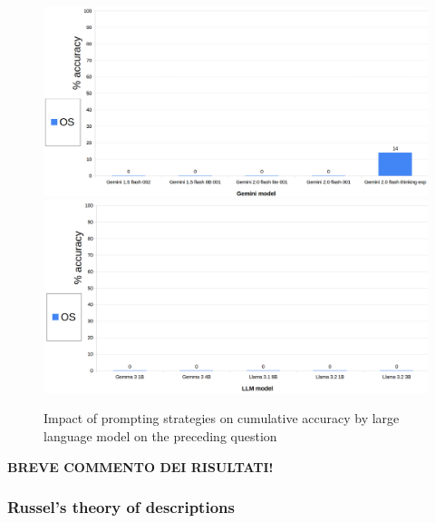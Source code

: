 \documentclass[12pt]{article}
\begin{document}
\begin{figure}[H]
    \centering
            \includegraphics[width=1\textwidth]{q204Gemini.png}
            \includegraphics[width=1\textwidth]{q204Other.png}
    \caption[Accuracy on Question 10 by LLM]{Impact of prompting strategies on cumulative accuracy by large language model on the preceding question}
    \end{figure} 
\textbf{BREVE COMMENTO DEI RISULTATI!}

\vspace{1cm}
\subsubsection{Russel’s theory of descriptions} %
\end{document}
